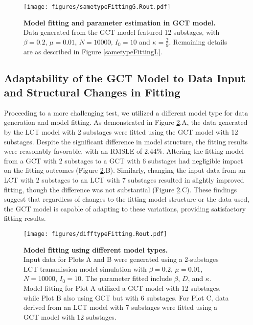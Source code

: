 \documentclass[12pt]{article}
\begin{document}
\begin{figure}[h!]
    \centering
    \texttt{[image: figures/sametypeFittingG.Rout.pdf]}
    \caption{\textbf{Model fitting and parameter estimation in GCT model.} \\ Data generated from the GCT model featured 12 substages, with $\beta=0.2$, $\mu=0.01$, $N=10000$, $I_0=10$ and $\kappa=\frac{2}{9}$. Remaining details are as described in Figure \ref{sametypeFittingL}.}
    \label{sametypeFittingG}
\end{figure}


\subsection{Adaptability of the GCT Model to Data Input and Structural Changes in Fitting}
Proceeding to a more challenging test, we utilized a different model type for data generation and model fitting. As demonstrated in Figure \ref{difftypeFitting}.A, the data generated by the LCT model with 2 substages were fitted using the GCT model with 12 substages. Despite the significant difference in model structure, the fitting results were reasonably favorable, with an RMSLE of 2.44\%. Altering the fitting model from a GCT with 2 substages to a GCT with 6 substages had negligible impact on the fitting outcomes (Figure \ref{difftypeFitting}.B). Similarly, changing the input data from an LCT with 2 substages to an LCT with 7 substages resulted in slightly improved fitting, though the difference was not substantial (Figure \ref{difftypeFitting}.C). These findings suggest that regardless of changes to the fitting model structure or the data used, the GCT model is capable of adapting to these variations, providing satisfactory fitting results.

\begin{figure}[h]
    \centering
    \texttt{[image: figures/difftypeFitting.Rout.pdf]}
    \caption{\textbf{Model fitting using different model types.} \\  Input data for Plots A and B were generated using a 2-substages LCT transmission model simulation with $\beta=0.2$, $\mu=0.01$, $N=10000$, $I_0=10$. The parameter fitted include $\beta$, $D$, and $\kappa$. Model fitting for Plot A utilized a GCT model with 12 substages, while Plot B also using GCT but with 6 substages. For Plot C, data derived from an LCT model with 7 substages were fitted using a GCT model with 12 substages.}
    \label{difftypeFitting}
\end{figure}
\end{document}

